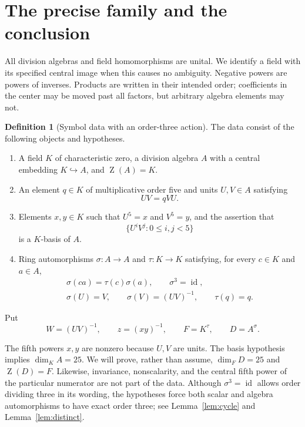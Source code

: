 \documentclass[11pt,letterpaper]{article}
\theoremstyle{definition}
\newtheorem{definition}[theorem]{Definition}
\theoremstyle{remark}
\newcommand{\Cent}{\operatorname{Z}}
\newcommand{\id}{\operatorname{id}}
\begin{document}
\section{The precise family and the conclusion}\label{sec:setup}

All division algebras and field homomorphisms are unital. We identify a field
with its specified central image when this causes no ambiguity. Negative
powers are powers of inverses. Products are written in their intended order;
coefficients in the center may be moved past all factors, but arbitrary
algebra elements may not.

\begin{definition}[Symbol data with an order-three action]\label{def:data}
The data consist of the following objects and hypotheses.
\begin{enumerate}[label=\textup{(\roman*)},leftmargin=2.4em]
\item A field $K$ of characteristic zero, a division algebra $A$ with a
central embedding $K\hookrightarrow A$, and $\Cent(A)=K$.
\item An element $q\in K$ of multiplicative order five and units $U,V\in A$
satisfying
\begin{equation}\label{eq:quantum}
UV=qVU.
\end{equation}
\item Elements $x,y\in K$ such that $U^5=x$ and $V^5=y$, and the assertion
that
\begin{equation}\label{eq:basis}
\{U^iV^j:0\leq i,j<5\}
\end{equation}
is a $K$-basis of $A$.
\item Ring automorphisms $\sigma\colon A\to A$ and $\tau\colon K\to K$
satisfying, for every $c\in K$ and $a\in A$,
\begin{equation}\label{eq:action}
\begin{gathered}
\sigma(ca)=\tau(c)\sigma(a),\qquad \sigma^3=\id,\\
\sigma(U)=V,\qquad \sigma(V)=(UV)^{-1},\qquad \tau(q)=q.
\end{gathered}
\end{equation}
\end{enumerate}
Put
\begin{equation}\label{eq:fixed}
W=(UV)^{-1},\qquad z=(xy)^{-1},\qquad
F=K^\tau,\qquad D=A^\sigma.
\end{equation}
\end{definition}

The fifth powers $x,y$ are nonzero because $U,V$ are units. The basis
hypothesis implies $\dim_K A=25$. We will prove, rather than assume,
$\dim_F D=25$ and $\Cent(D)=F$. Likewise, invariance, nonscalarity, and the
central fifth power of the particular numerator are not part of the data.
Although $\sigma^3=\id$ allows order dividing three in its wording, the
hypotheses force both scalar and algebra automorphisms to have exact order
three; see Lemma~\ref{lem:cycle} and Lemma~\ref{lem:distinct}.
\end{document}
